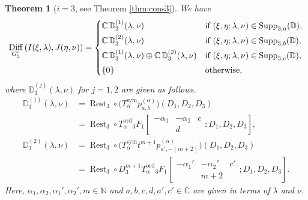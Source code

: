 \documentclass[a4paper,11pt,reqno]{amsart}
\newcommand{\CC}{\mathbb{C}}
\newcommand{\DD}{\mathbb{D}}
\newcommand{\NN}{\mathbb{N}}
\newcommand{\0}{{\bf 0}}
\newcommand{\1}{{\bf 1}}
\newcommand{\ord}{{\mathrm{ord}}}
\DeclareMathOperator{\Supp}{Supp}
\DeclareMathOperator{\Diff}{Diff}
\DeclareMathOperator{\Rest}{Rest}
\theoremstyle{plain}
\newtheorem{thmalph}{Theorem}
\theoremstyle{definition}
\numberwithin{equation}{section}
\theoremstyle{definition}
\begin{document}
\begin{thmalph}[$i=3$, see Theorem \ref{thm:cons3}]
\label{Intro:D}
We have
\begin{equation*}
\Diff_{G_3^\prime}\left(I(\xi, \lambda), J(\eta, \nu)\right)
=
\begin{cases}
\CC\, \DD^{(1)}_3(\lambda, \nu) & 
\textnormal{if $(\xi, \eta; \lambda, \nu) \in \Supp_{3,a}(\DD)$},\\[3pt]
\CC\, \DD^{(2)}_3(\lambda, \nu) & 
\textnormal{if $(\xi, \eta; \lambda, \nu) \in \Supp_{3,b}(\DD)$},\\[3pt]
\CC\, \DD^{(1)}_3(\lambda, \nu) 
\oplus
\CC\, \DD^{(2)}_3(\lambda, \nu)
& \textnormal{if $(\xi, \eta; \lambda, \nu) \in \Supp_{3,c}(\DD)$},\\[3pt]
\{0\} &\textnormal{otherwise},
\end{cases}
\end{equation*}
where $\DD^{(j)}_3(\lambda, \nu)$ for $j=1,2$ are given as follows.
\begin{align*}
\DD^{(1)}_3(\lambda,\nu)
&=\Rest_3\circ
\big(T^{\mathrm{sym}}_{\alpha} 
p^{(\alpha)}_{a,b}\big)
(D_1, D_2, D_3)\\[5pt]
&=\Rest_3\circ 
T^\ord_{\alpha}{}_3F_1\left [\begin{matrix}
    -\alpha_1 &-\alpha_2 & c\\
     &d&  
\end{matrix}; D_1, D_2, D_3 \right ],\\[10pt]
\DD^{(2)}_3(\lambda,\nu)
&=\Rest_3\circ \big(T^{\mathrm{sym}}_{\alpha} 
t^{m+1}p^{(\alpha)}_{a',-(m+2)}\big)(D_1, D_2, D_3) \\[5pt]
&=\Rest_3\circ  D_3^{m+1}
T^\ord_{\alpha}{}_3F_1\left [\begin{matrix}
    -\alpha_1' & -\alpha_2' & c'\\
    & m+2& 
\end{matrix}; D_1, D_2, D_3\right ].
\end{align*}
Here, $\alpha_1,\alpha_2,\alpha_1',\alpha_2',m\in \NN$ and $a,b,c,d,a',c'\in \CC$ are given in terms of $\lambda$ and $\nu$.
\end{thmalph}
\end{document}
